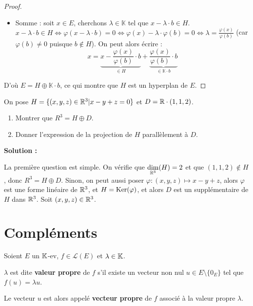 \documentclass[12pt, a4paper]{report}
\begin{document}
\begin{proof}
\begin{itemize}
        \item Somme : soit $x \in E$, cherchons $\lambda \in \mathbb{K}$ tel que $x - \lambda \cdot b \in H$.
        $x - \lambda \cdot b \in H \iff \varphi(x - \lambda \cdot b) = 0 \iff \varphi(x) - \lambda \cdot \varphi(b) = 0 \iff \lambda = \frac{\varphi(x)}{\varphi(b)}$ (car $\varphi(b) \neq 0$ puisque $b \notin H$).
        On peut alors écrire :
        $$x = \underbrace{x - \frac{\varphi(x)}{\varphi(b)} \cdot b}_{\in H} + \underbrace{\frac{\varphi(x)}{\varphi(b)} \cdot b}_{\in \mathbb{K} \cdot b}$$
    \end{itemize}
    D'où $E = H \oplus \mathbb{K} \cdot b$, ce qui montre que $H$ est un hyperplan de $E$.
\end{proof}

\begin{exercise}
    On pose $H = \{(x,y,z) \in \mathbb{R}^3 | x -y + z = 0\}$ et $D = \mathbb{R}\cdot(1,1,2)$.
    \begin{enumerate}
        \item Montrer que $R^3 = H \oplus D$.
        \item Donner l'expression de la projection de $H$ parallèlement à $D$.
    \end{enumerate}

    \textbf{Solution :}

    \begin{outline}
        \1 La première question est simple. On vérifie que $\underset{\mathbb{R}^3}\dim(H) = 2$ et que $(1,1,2) \notin H$, donc $R^3 = H \oplus D$.
        \1 Sinon, on peut aussi poser $\varphi : (x,y,z) \mapsto x - y + z$, alors $\varphi$ est une forme linéaire de $\mathbb{R}^3$, et $H = \mathrm{Ker}(\varphi)$, et alors $D$ est un supplémentaire de $H$ dans $\mathbb{R}^3$.
        \1 Soit $(x,y,z) \in \mathbb{R}^3$.
        \2 
    \end{outline}
\end{exercise}

\chapter{Compléments}

\begin{definition}
    Soient $E$ un $\mathbb{K}$-ev, $f \in \mathcal L(E)$ et $\lambda \in \mathbb{K}$.

    $\lambda$ est dite \textbf{valeur propre} de $f$ s'il existe un vecteur non nul $u \in E\setminus\{0_E\}$ tel que $f(u) = \lambda u$.

    Le vecteur $u$ est alors appelé \textbf{vecteur propre} de $f$ associé à la valeur propre $\lambda$.
\end{definition}
\end{document}
